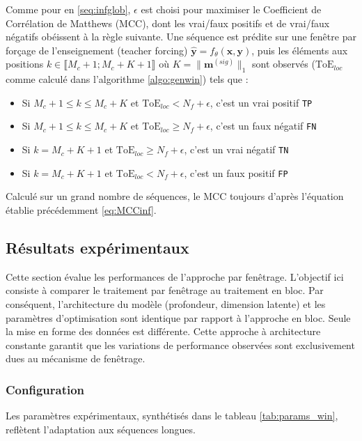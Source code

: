 Comme pour en \ref{seq:infglob}, $\epsilon$ est choisi pour maximiser le Coefficient de Corrélation de Matthews (MCC), dont les vrai/faux positifs et de vrai/faux négatifs obéissent à la règle suivante. Une séquence est prédite sur une fenêtre par forçage de l'enseignement (teacher forcing) $\hat{\mathbf{y}} = f_{\theta}(\mathbf{x}, \mathbf{y})$, puis les éléments aux positions $k \in  \llbracket M_c + 1; M_c + K + 1 \rrbracket$ où $K= \|\mathbf{m}^{(sig)}\|_1$ sont observés ($\text{ToE}_{loc}$ comme calculé dans l'algorithme \ref{algo:genwin}) tels que :
\begin{itemize}
\item Si $M_c + 1 \leq k \leq M_c + K$ et $\text{ToE}_{loc} < N_f + \epsilon$, c'est un vrai positif \texttt{TP}
\item Si $M_c + 1 \leq k \leq M_c + K$ et $\text{ToE}_{loc} \geq N_f + \epsilon$, c'est un faux négatif \texttt{FN}
\item Si $k = M_c + K + 1$ et $\text{ToE}_{loc} \geq N_f + \epsilon$, c'est un vrai négatif \texttt{TN}
\item Si $k = M_c + K + 1$ et $\text{ToE}_{loc} < N_f + \epsilon$, c'est un faux positif \texttt{FP}
\end{itemize}
Calculé sur un grand nombre de séquences, le MCC toujours d'après l'équation établie précédemment \eqref{eq:MCCinf}.


\subsection{Résultats expérimentaux}
Cette section évalue les performances de l'approche par fenêtrage. L'objectif ici consiste à comparer le traitement par fenêtrage au traitement en bloc. Par conséquent, l'architecture du modèle (profondeur, dimension latente) et les paramètres d'optimisation sont identique par rapport à l'approche en bloc. Seule la mise en forme des données est différente. Cette approche à architecture constante garantit que les variations de performance observées sont exclusivement dues au mécanisme de fenêtrage.

\subsubsection{Configuration}
Les paramètres expérimentaux, synthétisés dans le tableau \ref{tab:params_win}, reflètent l'adaptation aux séquences longues.\\

